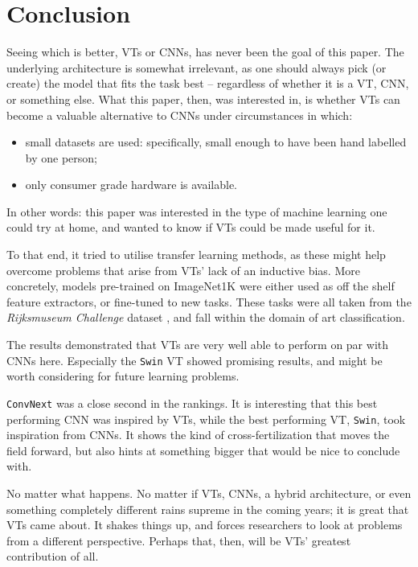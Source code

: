 \section{Conclusion}
Seeing which is better, VTs or CNNs, has never been the goal of this paper. The underlying architecture is somewhat irrelevant, as one should always pick (or create) the model that fits the task best -- regardless of whether it is a VT, CNN, or something else. What this paper, then, was interested in, is whether VTs can become a valuable alternative to CNNs under circumstances in which:
\begin{itemize}
\item small datasets are used: specifically, small enough to have been hand labelled by one person;
\item only consumer grade hardware is available.
\end{itemize}
In other words: this paper was interested in the type of machine learning one could try at home, and wanted to know if VTs could be made useful for it.

To that end, it tried to utilise transfer learning methods, as these might help overcome problems that arise from VTs' lack of an inductive bias. More concretely, models pre-trained on ImageNet1K were either used as off the shelf feature extractors, or fine-tuned to new tasks. These tasks were all taken from the \textit{Rijksmuseum Challenge} dataset \citep{mensink14icmr}, and fall within the domain of art classification.

The results demonstrated that VTs are very well able to perform on par with CNNs here. Especially the \texttt{Swin} VT showed promising results, and might be worth considering for future learning problems.

\texttt{ConvNext} was a close second in the rankings. It is interesting that this best performing CNN was inspired by VTs, while the best performing VT, \texttt{Swin}, took inspiration from CNNs. It shows the kind of cross-fertilization that moves the field forward, but also hints at something bigger that would be nice to conclude with.

No matter what happens. No matter if VTs, CNNs, a hybrid architecture, or even something completely different rains supreme in the coming years; it is great that VTs came about. It shakes things up, and forces researchers to look at problems from a different perspective. Perhaps that, then, will be VTs' greatest contribution of all.
